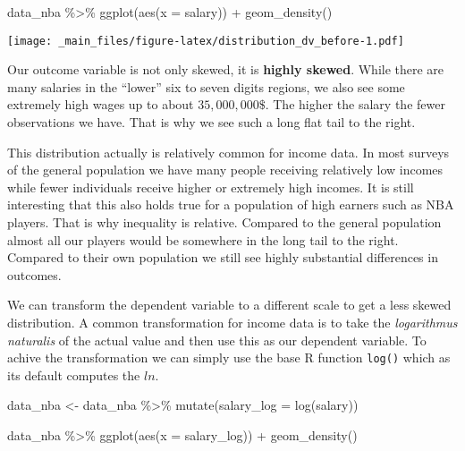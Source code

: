 \documentclass[
]{book}
\newenvironment{Shaded}{\begin{snugshade}}{\end{snugshade}}
\newcommand{\AttributeTok}[1]{\textcolor[rgb]{0.77,0.63,0.00}{#1}}
\newcommand{\AttributeTok}[1]{\textcolor[rgb]{0.13,0.29,0.53}{#1}}
\newcommand{\FunctionTok}[1]{\textcolor[rgb]{0.00,0.00,0.00}{#1}}
\newcommand{\FunctionTok}[1]{\textcolor[rgb]{0.13,0.29,0.53}{\textbf{#1}}}
\newcommand{\NormalTok}[1]{#1}
\newcommand{\OtherTok}[1]{\textcolor[rgb]{0.56,0.35,0.01}{#1}}
\newcommand{\SpecialCharTok}[1]{\textcolor[rgb]{0.00,0.00,0.00}{#1}}
\newcommand{\SpecialCharTok}[1]{\textcolor[rgb]{0.81,0.36,0.00}{\textbf{#1}}}
\begin{document}
\begin{Shaded}
\begin{Highlighting}[]
\NormalTok{data\_nba }\SpecialCharTok{\%\textgreater{}\%} 
  \FunctionTok{ggplot}\NormalTok{(}\FunctionTok{aes}\NormalTok{(}\AttributeTok{x =}\NormalTok{ salary)) }\SpecialCharTok{+}
  \FunctionTok{geom\_density}\NormalTok{()}
\end{Highlighting}
\end{Shaded}

\texttt{[image: \_main\_files/figure-latex/distribution\_dv\_before-1.pdf]}

Our outcome variable is not only skewed, it is \textbf{highly skewed}. While there
are many salaries in the ``lower'' six to seven digits regions, we also see some
extremely high wages up to about \(35,000,000\$\). The higher the salary the fewer
observations we have. That is why we see such a long flat tail to the right.

This distribution actually is relatively common for income data. In most surveys
of the general population we have many people receiving relatively low incomes
while fewer individuals receive higher or extremely high incomes. It is still
interesting that this also holds true for a population of high earners such as
NBA players. That is why inequality is relative. Compared to the general
population almost all our players would be somewhere in the long tail to the
right. Compared to their own population we still see highly substantial
differences in outcomes.

We can transform the dependent variable to a different scale to get a less
skewed distribution. A common transformation for income data is to take the
\emph{logarithmus naturalis} of the actual value and then use this as our
dependent variable. To achive the transformation we can simply use the base R
function \texttt{log()} which as its default computes the \(ln\).

\begin{Shaded}
\begin{Highlighting}[]
\NormalTok{data\_nba }\OtherTok{\textless{}{-}}\NormalTok{ data\_nba }\SpecialCharTok{\%\textgreater{}\%} 
  \FunctionTok{mutate}\NormalTok{(}\AttributeTok{salary\_log =} \FunctionTok{log}\NormalTok{(salary))}

\NormalTok{data\_nba }\SpecialCharTok{\%\textgreater{}\%} 
  \FunctionTok{ggplot}\NormalTok{(}\FunctionTok{aes}\NormalTok{(}\AttributeTok{x =}\NormalTok{ salary\_log)) }\SpecialCharTok{+}
  \FunctionTok{geom\_density}\NormalTok{()}
\end{Highlighting}
\end{Shaded}
\end{document}
